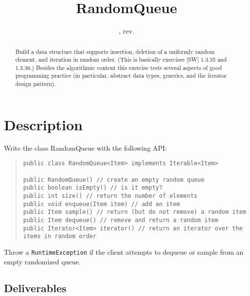 \documentclass{tufte-handout}
\title{RandomQueue}
\author{}
\date{\GITAuthorDate, rev. \GITAbrHash}
\begin{document}
\maketitle

\begin{abstract}
  Build a data structure that supports insertion, deletion of a
  uniformly random element, and iteration in random order.
  (This is basically exercises [SW] 1.3.35 and 1.3.36.)
  Besides the algorithmic content this exercise tests several aspects
  of good programming practice (in particular, abstract data types,
  generics, and the iterator design pattern).
\end{abstract}

\section{Description}

Write the class RandomQueue with the following API:

\begin{quotation}
\begin{fullwidth}\small
\begin{verbatim}
public class RandomQueue<Item> implements Iterable<Item>

public RandomQueue() // create an empty random queue
public boolean isEmpty() // is it empty?
public int size() // return the number of elements
public void enqueue(Item item) // add an item
public Item sample() // return (but do not remove) a random item
public Item dequeue() // remove and return a random item
public Iterator<Item> iterator() // return an iterator over the items in random order
\end{verbatim}
\end{fullwidth}
\end{quotation}

Throw a {\tt RuntimeException} if the client attempts to dequeue or
sample from an empty randomized queue.

\subsection{Deliverables}
\end{document}
